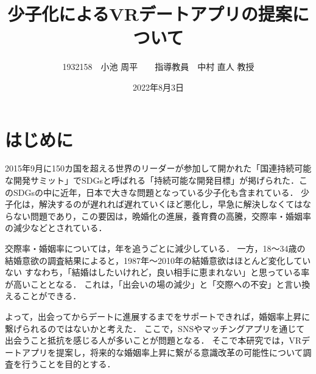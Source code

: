 \documentclass[12pt]{ltjsarticle}
\title{少子化によるVRデートアプリの提案について}
\author{1932158　小池 周平　　指導教員　中村 直人 教授}
\date{2022年8月3日}
\begin{document}
\maketitle

\section{はじめに}



2015年9月に150カ国を超える世界のリーダーが参加して開かれた「国連持続可能な開発サミット」でSDGsと呼ばれる「持続可能な開発目標」が掲げられた．このSDGsの中に近年，日本で大きな問題となっている少子化も含まれている．
少子化は，解決するのが遅れれば遅れていくほど悪化し，早急に解決しなくてはならない問題であり，この要因は，晩婚化の進展，養育費の高騰，交際率・婚姻率の減少などとされている．





交際率・婚姻率については，年を追うごとに減少している．
一方，18〜34歳の結婚意欲の調査結果によると，1987年〜2010年の結婚意欲はほとんど変化していない
すなわち，「結婚はしたいけれど，良い相手に恵まれない」と思っている率が高いこととなる．
これは，「出会いの場の減少」と「交際への不安」と言い換えることができる．

よって，出会ってからデートに進展するまでをサポートできれば，婚姻率上昇に繋げられるのではないかと考えた．
ここで，SNSやマッチングアプリを通じて出会うこと抵抗を感じる人が多いことが問題となる．
そこで本研究では，VRデートアプリを提案し，将来的な婚姻率上昇に繋がる意識改革の可能性について調査を行うことを目的とする．
\end{document}
